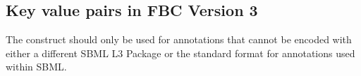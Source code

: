 

\newpage
\subsection{Key value pairs in FBC Version 3}
\label{best-practices-V3}
The \KeyValuePair construct should only be used for annotations that cannot be encoded with either a different SBML L3 Package or the standard format for annotations used within SBML.
